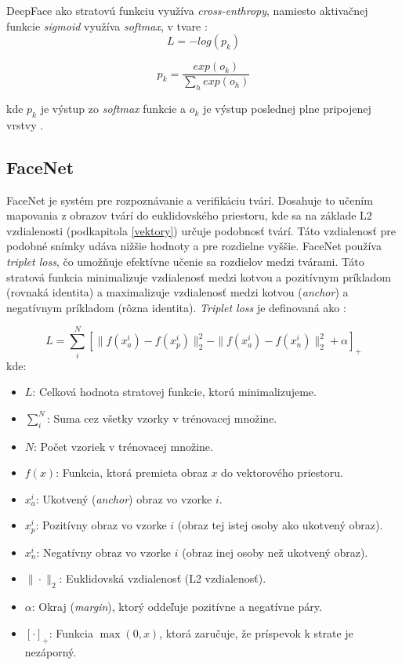 DeepFace ako stratovú funkciu využíva \textit{cross-enthropy}, namiesto aktivačnej funkcie \textit{sigmoid} využíva \textit{softmax}, v tvare \cite{Deepface_clanok}:
\begin{equation}
    L = -log(p_{k})
\end{equation}

\begin{equation}
    p_k = \frac{exp(o_k)}{\sum_h exp(o_h)}
\end{equation}

kde $p_k$ je výstup zo \textit{softmax} funkcie a $o_k$ je výstup poslednej plne pripojenej vrstvy \cite{Deepface_clanok}.

\subsection{FaceNet}
FaceNet je systém pre rozpoznávanie a verifikáciu tvárí. Dosahuje to učením mapovania z obrazov tvárí do euklidovského priestoru, kde sa na základe L2 vzdialenosti (podkapitola \ref{vektory}) určuje podobnosť tvárí. Táto vzdialenosť pre podobné snímky udáva nižšie hodnoty a pre rozdielne vyššie. FaceNet používa \textit{triplet loss}, čo umožňuje efektívne učenie sa rozdielov medzi tvárami. Táto stratová funkcia minimalizuje vzdialenosť medzi kotvou a pozitívnym príkladom (rovnaká identita) a maximalizuje vzdialenosť medzi kotvou (\textit{anchor}) a negatívnym príkladom (rôzna identita). \textit{Triplet loss} je definovaná ako \cite{facenet}:

\begin{equation}
    L = \sum_{i}^{N} \left[ \| f(x_a^i) - f(x_p^i) \|_2^2 - \| f(x_a^i) - f(x_n^i) \|_2^2 + \alpha \right]_+
    \label{eq:triplet_loss}
\end{equation}
kde:
\begin{itemize}
    \item $L$: Celková hodnota stratovej funkcie, ktorú minimalizujeme.
    \item $\sum_{i}^{N}$: Suma cez všetky vzorky v trénovacej množine.
    \item $N$: Počet vzoriek v trénovacej množine.
    \item $f(x)$: Funkcia, ktorá premieta obraz $x$ do vektorového priestoru.
    \item $x_a^i$: Ukotvený (\textit{anchor}) obraz vo vzorke $i$.
    \item $x_p^i$: Pozitívny obraz vo vzorke $i$ (obraz tej istej osoby ako ukotvený obraz).
    \item $x_n^i$: Negatívny obraz vo vzorke $i$ (obraz inej osoby než ukotvený obraz).
    \item $\| \cdot \|_2$: Euklidovská vzdialenosť (L2 vzdialenosť).
    \item $\alpha$: Okraj (\textit{margin}), ktorý oddeľuje pozitívne a negatívne páry.
    \item $[\cdot]_+$: Funkcia $\max(0, x)$, ktorá zaručuje, že príspevok k strate je nezáporný.
\end{itemize}

